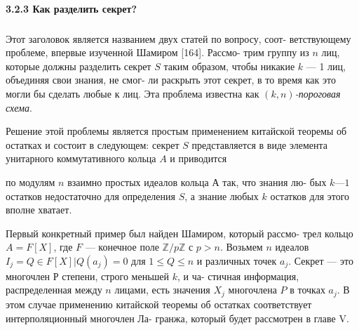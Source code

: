 \paragraph{3.2.3 Как разделить секрет?}
\subparagraph{} Этот заголовок является названием двух статей по вопросу, соот­-\linebreak
ветствующему проблеме, впервые изученной Шамиром [164]. Рассмо­-\linebreak
трим группу из $n$ лиц, которые должны разделить секрет $S$ таким\linebreak
образом, чтобы никакие $k$ — 1 лиц, объединяя свои знания, не смог-\linebreak­
ли раскрыть этот секрет, в то время как это могли бы сделать любые\linebreak
к лиц. Эта проблема известна как \textit{$(k, n)$-пороговая схема}.\linebreak

Решение этой проблемы является простым применением китайской\linebreak
теоремы об остатках и состоит в следующем: секрет $S$ представляется\linebreak
в виде элемента унитарного коммутативного кольца $A$ и приводится\linebreak

\newpage

\noindent по модулям $n$ взаимно простых идеалов кольца $А$ так, что знания лю-­\linebreak
бых $k — 1$ остатков недостаточно для определения $S$, а знание любых $k$\linebreak
остатков для этого вполне хватает.

Первый конкретный пример был найден Шамиром, который рассмо­-\linebreak
трел кольцо $A = F[X]$, где $F$ — конечное поле $\mathbb{Z}/ p \mathbb{Z}$ с $p > n$. Возьмем\linebreak
$n$ идеалов $I_j = {Q \in F[X] | Q(a_j) = 0}$ для $1\leq Q \leq n$ и различных\linebreak
точек $a_j$. Секрет — это многочлен $Р$ степени, строго меньшей $k$, и ча­-\linebreak
стичная информация, распределенная между $n$ лицами, есть значения\linebreak
$X_j$ многочлена $P$ в точках $a_j$. В этом случае применению китайской\linebreak
теоремы об остатках соответствует интерполяционный многочлен Ла­-\linebreak
гранжа, который будет рассмотрен в главе V.

